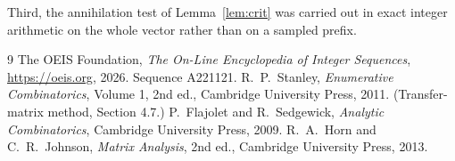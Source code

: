 \documentclass[11pt,a4paper]{article}
\theoremstyle{plain}
\theoremstyle{definition}
\begin{document}
Third, the annihilation test of Lemma~\ref{lem:crit} was carried out in exact integer
arithmetic on the whole vector rather than on a sampled prefix.

\begin{thebibliography}{9}
 The OEIS Foundation, \emph{The On-Line Encyclopedia of Integer
Sequences}, \url{https://oeis.org}, 2026. Sequence A221121.
 R.~P.~Stanley, \emph{Enumerative Combinatorics}, Volume 1, 2nd ed.,
Cambridge University Press, 2011. (Transfer-matrix method, Section 4.7.)
 P.~Flajolet and R.~Sedgewick, \emph{Analytic Combinatorics}, Cambridge
University Press, 2009.
 R.~A.~Horn and C.~R.~Johnson, \emph{Matrix Analysis}, 2nd ed., Cambridge
University Press, 2013.
\end{thebibliography}
\end{document}
